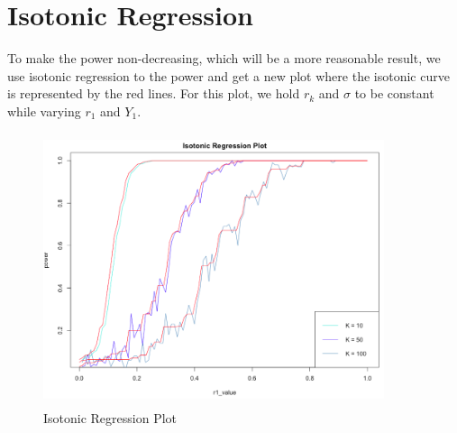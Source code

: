 \documentclass[10pt,english]{article}\usepackage{graphicx, color}
\numberwithin{equation}{section}
\numberwithin{figure}{section}
\begin{document}
\section{Isotonic Regression}
To make the power non-decreasing, which will be a more reasonable result, we use isotonic regression to the power and get a new plot where the isotonic curve is represented by the red lines. For this plot, we hold $r_k$ and $\sigma$ to be constant while varying $r_1$ and $Y_1$.\\
\begin{figure}[htbp]
\centering\includegraphics[width=10cm, height=8cm]{iso}
\caption{Isotonic Regression Plot}
\end{figure}
\quad\\
\quad\\
\quad\\
\quad\\
\quad\\
\quad\\
\quad\\
\quad\\
\quad\\
\end{document}
